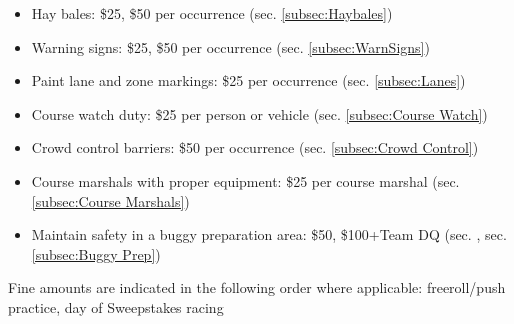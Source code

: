 \begin{appendices}
\begin{itemize}
			\item Hay bales: \$25, \$50 per occurrence (sec. \ref{subsec:Haybales})
			
			\item Warning signs: \$25, \$50 per occurrence (sec. \ref{subsec:WarnSigns})

			\item Paint lane and zone markings: \$25 per occurrence (sec. \ref{subsec:Lanes})

			\item Course watch duty: \$25 per person or vehicle (sec. \ref{subsec:Course Watch})

			\item Crowd control barriers: \$50 per occurrence (sec. \ref{subsec:Crowd Control})

			\item Course marshals with proper equipment: \$25 per course marshal (sec. \ref{subsec:Course Marshals})
			
			\item Maintain safety in a buggy preparation area: \$50, \$100+Team DQ (sec. , sec. \ref{subsec:Buggy Prep})

		\end{itemize}

		\noindent Fine amounts are indicated in the following order where applicable: \newline
		freeroll/push practice, day of Sweepstakes racing
\end{appendices}
